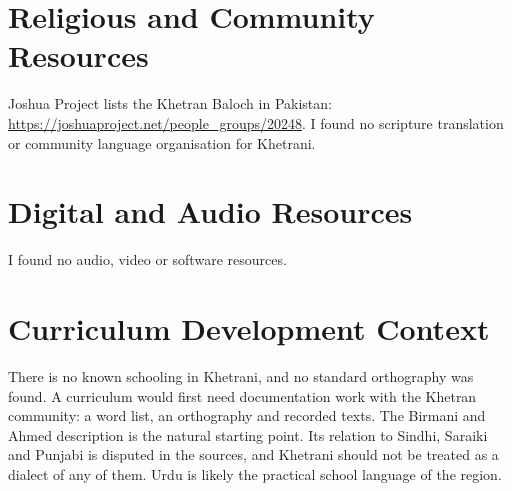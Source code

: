 \documentclass[12pt]{article}
\begin{document}
\section{Religious and Community Resources}
Joshua Project lists the Khetran Baloch in Pakistan: \url{https://joshuaproject.net/people_groups/20248}. I found no scripture translation or community language organisation for Khetrani.

\section{Digital and Audio Resources}
I found no audio, video or software resources.

\section{Curriculum Development Context}
There is no known schooling in Khetrani, and no standard orthography was found. A curriculum would first need documentation work with the Khetran community: a word list, an orthography and recorded texts. The Birmani and Ahmed description is the natural starting point. Its relation to Sindhi, Saraiki and Punjabi is disputed in the sources, and Khetrani should not be treated as a dialect of any of them. Urdu is likely the practical school language of the region.
\end{document}
